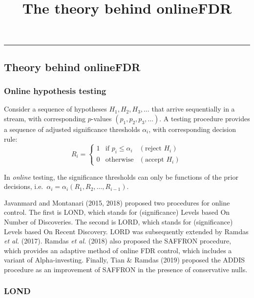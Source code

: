 \documentclass[
]{article}
\title{The theory behind onlineFDR}
\author{}
\date{\vspace{-2.5em}}
\begin{document}
\maketitle

{
\setcounter{tocdepth}{2}
\tableofcontents
}
\begin{center}\rule{0.5\linewidth}{0.5pt}\end{center}

\hypertarget{theory-behind-onlinefdr}{%
\subsection{Theory behind onlineFDR}\label{theory-behind-onlinefdr}}

\hypertarget{online-hypothesis-testing}{%
\subsubsection{Online hypothesis
testing}\label{online-hypothesis-testing}}

Consider a sequence of hypotheses \(H_1, H_2, H_3, \ldots\) that arrive
sequentially in a stream, with corresponding \(p\)-values
\((p_1, p_2, p_3, \ldots)\). A testing procedure provides a sequence of
adjusted significance thresholds \(\alpha_i\), with corresponding
decision rule: \[ R_i = \begin{cases}
1 & \text{if } p_i \leq \alpha_i & (\text{reject } H_i)\\
0 & \text{otherwise} & (\text{accept } H_i)
\end{cases} \]

In \emph{online} testing, the significance thresholds can only be
functions of the prior decisions,
i.e.~\(\alpha_i = \alpha_i(R_1, R_2, \ldots, R_{i-1})\).

Javanmard and Montanari (2015, 2018) proposed two procedures for online
control. The first is LOND, which stands for (significance) Levels based
On Number of Discoveries. The second is LORD, which stands for
(significance) Levels based On Recent Discovery. LORD was subsequently
extended by Ramdas \emph{et al.} (2017). Ramdas \emph{et al.} (2018)
also proposed the SAFFRON procedure, which provides an adaptive method
of online FDR control, which includes a variant of Alpha-investing.
Finally, Tian \& Ramdas (2019) proposed the ADDIS procedure as an
improvement of SAFFRON in the presence of conservative nulls.

\hypertarget{LOND}{%
\subsubsection{LOND}\label{LOND}}
\end{document}
